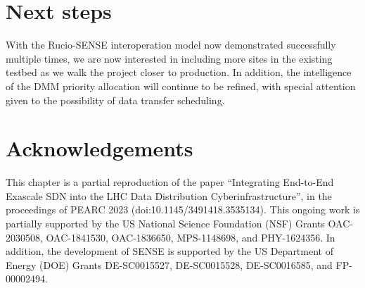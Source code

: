\section{Next steps}
With the Rucio-SENSE interoperation model now demonstrated successfully multiple times, we are now interested in including more sites in the existing testbed as we walk the project closer to production. 
In addition, the intelligence of the DMM priority allocation will continue to be refined, with special attention given to the possibility of data transfer scheduling. 

\section{Acknowledgements}
This chapter is a partial reproduction of the paper ``Integrating End-to-End Exascale SDN into the LHC Data Distribution Cyberinfrastructure'', in the proceedings of PEARC 2023 (doi:10.1145/3491418.3535134). 
This ongoing work is partially supported by the US National Science Foundation (NSF) Grants OAC-2030508, OAC-1841530, OAC-1836650, MPS-1148698, and PHY-1624356.
In addition, the development of SENSE is supported by the US Department of Energy (DOE) Grants DE-SC0015527, DE-SC0015528, DE-SC0016585, and FP-00002494.
